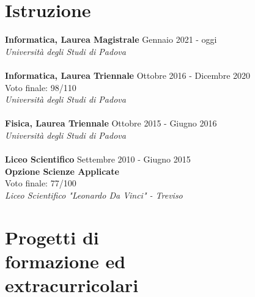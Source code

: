 \documentclass[margin, 10pt]{res}
\begin{document}
\begin{resume}
\section{Istruzione}
\textbf{Informatica, Laurea Magistrale} \hfill Gennaio 2021 - oggi \\
\textit{Università degli Studi di Padova} \\ \\
\textbf{Informatica, Laurea Triennale} \hfill Ottobre 2016 - Dicembre 2020 \\
Voto finale: 98/110 \\
\textit{Università degli Studi di Padova} \\ \\
\textbf{Fisica, Laurea Triennale} \hfill Ottobre 2015 - Giugno 2016 \\
\textit{Università degli Studi di Padova} \\ \\
\textbf{Liceo Scientifico} \hfill Settembre 2010 - Giugno 2015 \\
\textbf{Opzione Scienze Applicate} \\
Voto finale: 77/100 \\
\textit{Liceo Scientifico "Leonardo Da Vinci" - Treviso} 


\section{Progetti di \\ formazione ed \\ extracurricolari}


\end{resume}
\end{document}
